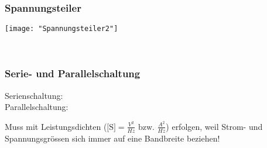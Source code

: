 \subsubsection{Spannungsteiler}
\begin{minipage}[t]{0.1\textwidth}
	\vspace{0pt}
	\texttt{[image: "Spannungsteiler2"]}
\end{minipage}\hspace{0.05\textwidth}
\begin{minipage}[t]{0.4\textwidth}
	\vspace{0pt}
\end{minipage}\hspace{0.05\textwidth}
\begin{minipage}[t]{0.4\textwidth}
	\\
\end{minipage}
\vspace{2mm}


\subsubsection{Serie- und Parallelschaltung}
\begin{minipage}[t]{0.4\textwidth}
	\vspace{0pt}
	Serienschaltung: \\
	Parallelschaltung: 
\end{minipage}\hspace{0.05\textwidth}
\begin{minipage}[t]{0.55\textwidth}
	\vspace{0pt}
	Muss mit Leistungsdichten ($\text{[S]} = \frac{V^2}{\mathit{Hz}} \text{ bzw. } \frac{A^2}{\mathit{Hz}}$) erfolgen, weil Strom-
	und Spannungsgrössen sich immer auf eine Bandbreite beziehen!
\end{minipage}\hspace{0.05\textwidth}
\vspace{2mm}

